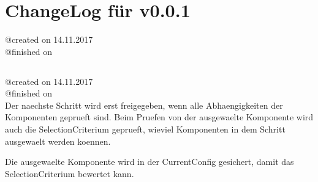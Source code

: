 \documentclass{article}
\begin{document}
\section{ChangeLog für v0.0.1}
@created on 14.11.2017\\
@finished on 

\subsection{}

@created on     14.11.2017\\
@finished on   \\

Der naechste Schritt wird erst freigegeben, wenn alle Abhaengigkeiten 
der Komponenten geprueft sind. Beim Pruefen von der ausgewaelte 
Komponente wird auch die SelectionCriterium geprueft, wieviel Komponenten 
in dem Schritt ausgewaelt werden koennen.
    
Die ausgewaelte Komponente wird in der CurrentConfig gesichert, damit das
SelectionCriterium bewertet kann.
    
\subsection{}
\end{document}
